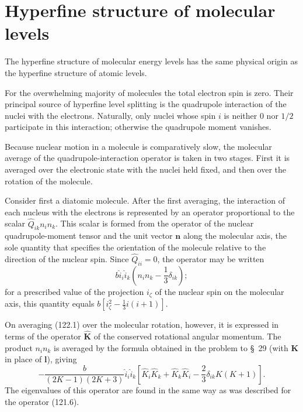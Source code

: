 \section{Hyperfine structure of molecular levels}

The hyperfine structure of molecular energy levels has the same physical
origin as the hyperfine structure of atomic levels.

For the overwhelming majority of molecules the total electron spin is zero.
Their principal source of hyperfine level splitting is the quadrupole
interaction of the nuclei with the electrons. Naturally, only nuclei whose
spin $i$ is neither 0 nor $1/2$ participate in this interaction; otherwise the
quadrupole moment vanishes.

Because nuclear motion in a molecule is comparatively slow, the molecular
average of the quadrupole-interaction operator is taken in two stages. First
it is averaged over the electronic state with the nuclei held fixed, and then
over the rotation of the molecule.

Consider first a diatomic molecule. After the first averaging, the interaction
of each nucleus with the electrons is represented by an operator proportional
to the scalar $\hat Q_{ik}n_in_k$. This scalar is formed from the operator of
the nuclear quadrupole-moment tensor and the unit vector $\mathbf n$ along the
molecular axis, the sole quantity that specifies the orientation of the
molecule relative to the direction of the nuclear spin. Since
$\hat Q_{ii}=0$, the operator may be written
\begin{equation}
 b\hat i_i\hat i_k\left(n_in_k-\frac13\delta_{ik}\right);
 \tag{122.1}
\end{equation}
for a prescribed value of the projection $i_\zeta$ of the nuclear spin on the
molecular axis, this quantity equals
$b[i_\zeta^2-\frac13i(i+1)]$.

On averaging (122.1) over the molecular rotation, however, it is expressed in
terms of the operator $\hat{\mathbf K}$ of the conserved rotational angular
momentum. The product $n_in_k$ is averaged by the formula obtained in the
problem to \S~29 (with $\mathbf K$ in place of $\mathbf l$), giving
\begin{equation}
 -\frac{b}{(2K-1)(2K+3)}\hat i_i\hat i_k
 \left[\hat K_i\hat K_k+\hat K_k\hat K_i
 -\frac23\delta_{ik}K(K+1)\right].
 \tag{122.2}
\end{equation}
The eigenvalues of this operator are found in the same way as was described
for the operator (121.6).

